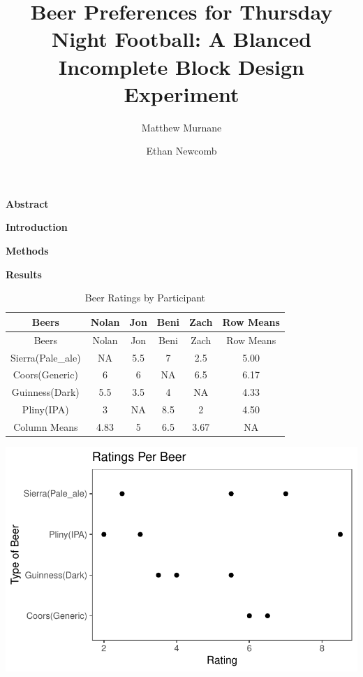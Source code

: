 \documentclass[
  12,
  letterpaper,
  DIV=11,
  numbers=noendperiod]{scrartcl}
\title{Beer Preferences for Thursday Night Football: A Blanced
Incomplete Block Design Experiment}
\author{Matthew Murnane \and Ethan Newcomb}
\date{}
\begin{document}
\maketitle
\ifdefined\Shaded\renewenvironment{Shaded}{\begin{tcolorbox}[interior hidden, frame hidden, borderline west={3pt}{0pt}{shadecolor}, breakable, enhanced, sharp corners, boxrule=0pt]}{\end{tcolorbox}}\fi

\newpage

\begin{center}
\textbf{\Large Abstract}
\end{center}

\newpage

\begin{center}
\textbf{\Large Introduction}
\end{center}

\newpage

\begin{center}
\textbf{\Large Methods}
\end{center}

\newpage

\begin{center}
\textbf{\Large Results}
\end{center}

\begin{longtable}[]{@{}cccccc@{}}
\caption{Beer Ratings by Participant}\tabularnewline
\toprule\noalign{}
Beers & Nolan & Jon & Beni & Zach & Row Means \\
\midrule\noalign{}
\endfirsthead
\toprule\noalign{}
Beers & Nolan & Jon & Beni & Zach & Row Means \\
\midrule\noalign{}
\endhead
\bottomrule\noalign{}
\endlastfoot
Sierra(Pale\_ale) & NA & 5.5 & 7 & 2.5 & 5.00 \\
Coors(Generic) & 6 & 6 & NA & 6.5 & 6.17 \\
Guinness(Dark) & 5.5 & 3.5 & 4 & NA & 4.33 \\
Pliny(IPA) & 3 & NA & 8.5 & 2 & 4.50 \\
Column Means & 4.83 & 5 & 6.5 & 3.67 & NA \\
\end{longtable}

\includegraphics{BIBD_beer_preferences_files/figure-pdf/unnamed-chunk-3-1.pdf}
\end{document}
